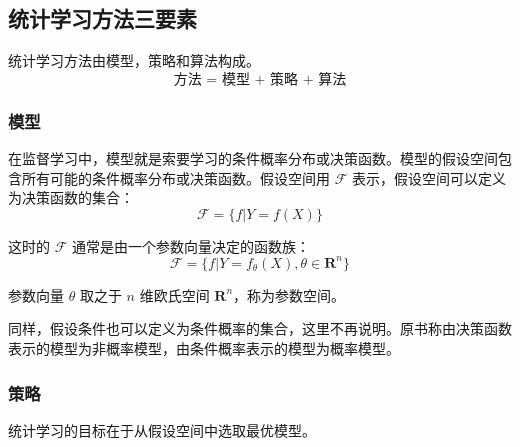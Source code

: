 \subsection{统计学习方法三要素}

统计学习方法由模型，策略和算法构成。
$$ \text{方法 = 模型 + 策略 + 算法} $$

\subsubsection{模型}

在监督学习中，模型就是索要学习的条件概率分布或决策函数。模型的假设空间包含所有可能的条件概率分布或决策函数。假设空间用 $\mathcal{F} $ 表示，假设空间可以定义为决策函数的集合：
\begin{equation}
    \mathcal{F} = \{f|Y=f(X)\}
\end{equation}

这时的 $\mathcal{F}$ 通常是由一个参数向量决定的函数族：
\begin{equation}
    \mathcal{F} = \{f|Y=f_{\theta}(X),\theta \in \mathbf{R}^n\}
\end{equation}

参数向量 $\theta$ 取之于 $n$ 维欧氏空间 $ \mathbf{R}^n$，称为参数空间。

同样，假设条件也可以定义为条件概率的集合，这里不再说明。原书称由决策函数表示的模型为非概率模型，由条件概率表示的模型为概率模型。

\subsubsection{策略}

统计学习的目标在于从假设空间中选取最优模型。

